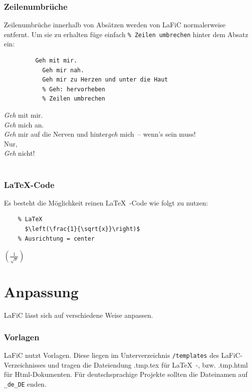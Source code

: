 \documentclass{scrartcl}
\begin{document}
\section{Zeilenumbrüche}

{Zeilenumbrüche  innerhalb von Absätzen werden von LaFiC normalerweise entfernt. Um sie zu erhalten füge einfach \texttt{\% Zeilen umbrechen} hinter dem Absatz ein:\\}

\begin{verbatim}
  	     Geh mit mir.
	       Geh mir nah.
	       Geh mir zu Herzen und unter die Haut
	       % Geh: hervorheben
	       % Zeilen umbrechen
\end{verbatim}


{\emph{Geh} mit mir.\\
\emph{Geh} mich an.\\
\emph{Geh} mir auf die Nerven und hinter\emph{geh} mich~– wenn's sein muss!\\
Nur,\\
\emph{Geh} nicht!\\\\}

\section{LaTeX-Code}

{Es besteht die Möglichkeit reinen \LaTeX\ -Code wie folgt zu
nutzen:\\}

\begin{verbatim}
	% LaTeX
  	  $\left(\frac{1}{\sqrt{x}}\right)$  
	% Ausrichtung = center
\end{verbatim}


\centering%
  $\left(\frac{1}{\sqrt{x}}\right)$
\part{Anpassung}

{LaFiC lässt sich auf verschiedene Weise anpassen.\\}

\section{Vorlagen}

{LaFiC nutzt Vorlagen. Diese liegen im Unterverzeichnis
\texttt{/templates} des LaFiC-Verzeichnisses und tragen die
Dateiendung .tmp.tex für \LaTeX\ -, bzw. .tmp.html für
Html-Dokumenten. Für deutschsprachige Projekte sollten die
Dateinamen auf \texttt{\_de\_DE} enden.\\}
\end{document}

